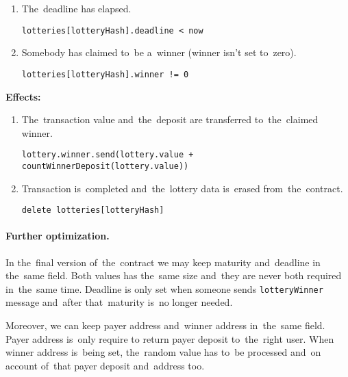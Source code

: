 \documentclass[a4paper]{article}
\begin{document}
\begin{enumerate}
            \begin{enumerate}
                \item The~deadline has elapsed.
                    \begin{center}
		                \texttt{lotteries[lotteryHash].deadline < now}
		            \end{center}
                \item Somebody has claimed to~be a~winner (winner isn't set to~zero).
                    \begin{center}
                        \texttt{lotteries[lotteryHash].winner != 0}
                    \end{center}
            \end{enumerate}
            \textbf{Effects:}
            \begin{enumerate}
                \item The~transaction value and~the~deposit are transferred to~the~claimed winner.
                    \begin{center}
			            \texttt{lottery.winner.send(lottery.value + countWinnerDeposit(lottery.value))}
			        \end{center}
                \item Transaction is~completed and~the~lottery data is~erased from~the~contract.
                    \begin{center}
                        \texttt{delete lotteries[lotteryHash]}
                    \end{center}
           \end{enumerate}
    \end{enumerate}

    \paragraph{Further optimization.} In the~final version of~the~contract we may keep maturity and~deadline in
        the~same field. Both values has the~same size and~they are never both required in~the~same time. Deadline is
        only set when someone sends \texttt{lotteryWinner} message and~after that~maturity is~no longer needed.

        Moreover, we can keep payer address and~winner address in~the~same field. Payer address is~only require to
        return payer deposit to~the~right user. When winner address is~being set, the~random value has to~be
        processed and~on account of~that payer deposit and~address too.
\end{document}
